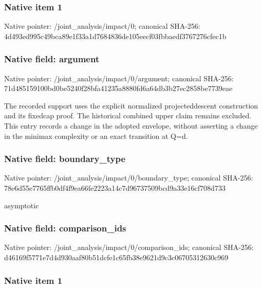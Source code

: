 \documentclass[10pt,a4paper]{article}
\begin{document}
\subsubsection{Native item 1}


Native pointer: /joint\_analysis/impact/0; canonical SHA-256: 4d493ed995c49bca89e1f33a\allowbreak{}1d7684836de105eecf03fbba\allowbreak{}edf3767276cfec1b



\subsubsection{Native field: argument}


Native pointer: /joint\_analysis/impact/0/argument; canonical SHA-256: 71d485159100bd0be5240f28\allowbreak{}bfa41235a8880fd6a64db3b2\allowbreak{}7ec2858be7739eae


The recorded support uses the explicit normalized projecteddescent construction and its fixedcap proof. The historical combined upper claim remains excluded. This entry records a change in the adopted envelope, without asserting a change in the minimax complexity or an exact transition at Q=d.


\subsubsection{Native field: boundary\_type}


Native pointer: /joint\_analysis/impact/0/boundary\_type; canonical SHA-256: 78e6d55e7765ffb0df4f9ea6\allowbreak{}6fe2223a14c7d96737509bcd\allowbreak{}9a33e16cf708d733


asymptotic


\subsubsection{Native field: comparison\_ids}


Native pointer: /joint\_analysis/impact/0/comparison\_ids; canonical SHA-256: d46169f5771e7d4d930aaf80\allowbreak{}b51dcfe1c65fb38e9621d9c3\allowbreak{}c06705312630c969



\subsubsection{Native item 1}
\end{document}
